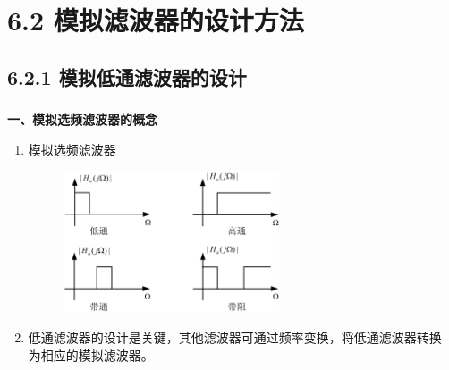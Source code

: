 \documentclass[notheorems,compress,mathserif,table]{beamer}
\begin{document}
\section{6.2 模拟滤波器的设计方法}
\subsection{6.2.1 模拟低通滤波器的设计}
\begin{frame}\frametitle{}%
\textbf{\heiti 一、模拟选频滤波器的概念}
\begin{enumerate}
       \item 模拟选频滤波器
        \begin{figure}[h]
            \centering
        \includegraphics[width=0.6\textwidth]{fig5_mndtgtdtdz.jpg}
        \end{figure}
       \item
       低通滤波器的设计是关键，其他滤波器可通过频率变换，将低通滤波器转换
       为相应的模拟滤波器。
\end{enumerate}
\end{frame}
\end{document}
